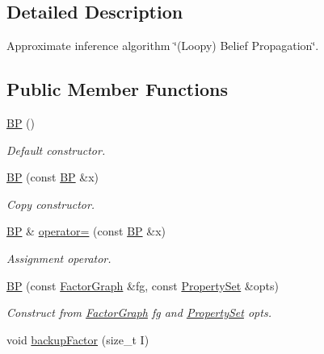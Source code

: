 \subsection{Detailed Description}
Approximate inference algorithm \char`\"{}(Loopy) Belief Propagation\char`\"{}. \subsection*{Public Member Functions}
\begin{CompactItemize}
\item 
\hypertarget{classdai_1_1BP_79a81420bd4370cdaad9d6a8d85c83a5}{
\hyperlink{classdai_1_1BP_79a81420bd4370cdaad9d6a8d85c83a5}{BP} ()}
\label{classdai_1_1BP_79a81420bd4370cdaad9d6a8d85c83a5}

\begin{CompactList}\small\item\em Default constructor. \item\end{CompactList}\item 
\hypertarget{classdai_1_1BP_e8480cbb4a614119a211ffc03221ba47}{
\hyperlink{classdai_1_1BP_e8480cbb4a614119a211ffc03221ba47}{BP} (const \hyperlink{classdai_1_1BP}{BP} \&x)}
\label{classdai_1_1BP_e8480cbb4a614119a211ffc03221ba47}

\begin{CompactList}\small\item\em Copy constructor. \item\end{CompactList}\item 
\hypertarget{classdai_1_1BP_ba6124da6c2a11b01c0f66cbe8ae9562}{
\hyperlink{classdai_1_1BP}{BP} \& \hyperlink{classdai_1_1BP_ba6124da6c2a11b01c0f66cbe8ae9562}{operator=} (const \hyperlink{classdai_1_1BP}{BP} \&x)}
\label{classdai_1_1BP_ba6124da6c2a11b01c0f66cbe8ae9562}

\begin{CompactList}\small\item\em Assignment operator. \item\end{CompactList}\item 
\hypertarget{classdai_1_1BP_cdfb5e4da942d55f02540d7a5fc29145}{
\hyperlink{classdai_1_1BP_cdfb5e4da942d55f02540d7a5fc29145}{BP} (const \hyperlink{classdai_1_1FactorGraph}{FactorGraph} \&fg, const \hyperlink{classdai_1_1PropertySet}{PropertySet} \&opts)}
\label{classdai_1_1BP_cdfb5e4da942d55f02540d7a5fc29145}

\begin{CompactList}\small\item\em Construct from \hyperlink{classdai_1_1FactorGraph}{FactorGraph} fg and \hyperlink{classdai_1_1PropertySet}{PropertySet} opts. \item\end{CompactList}\item 
\hypertarget{classdai_1_1DAIAlg_48ba6a58d10b8802d690e5e92ec5abe9}{
void \hyperlink{classdai_1_1DAIAlg_48ba6a58d10b8802d690e5e92ec5abe9}{backupFactor} (size\_\-t I)}
\label{classdai_1_1DAIAlg_48ba6a58d10b8802d690e5e92ec5abe9}


\end{CompactItemize}
